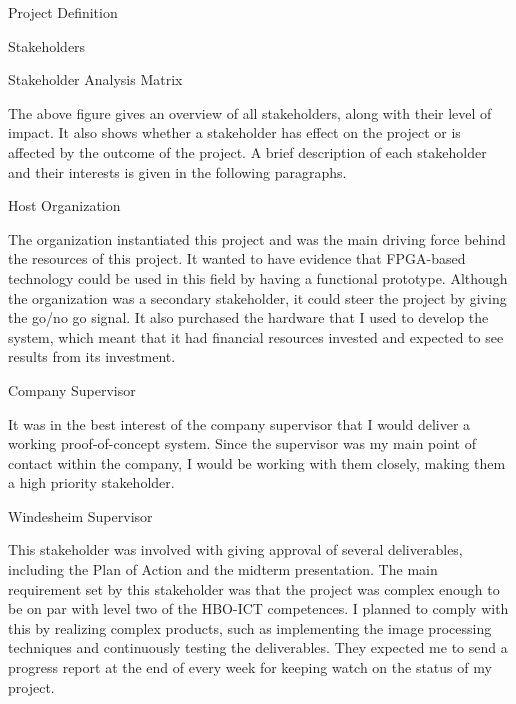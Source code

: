 \documentclass{matthijs}
\begin{document}
\begin{hoofdstuk}{Project Definition}
\begin{paragraaf}{Stakeholders}
\begin{figuur}{Stakeholder Analysis Matrix}
{\begin{tikzpicture}[baseline=(current bounding box.north)]
				\end{tikzpicture}
				}
			\end{figuur}
			\vspace{-1ex}

			\noindent The above figure gives an overview of all stakeholders, along with their level of impact.
			It also shows whether a stakeholder has effect on the project or is affected by the outcome of the project.
			A brief description of each stakeholder and their interests is given in the following paragraphs.

			
			\begin{subparagraaf}{Host Organization}

				The organization instantiated this project and was the main driving force behind the resources of this project.
				It wanted to have evidence that FPGA-based technology could be used in this field by having a functional prototype.
				Although the organization was a secondary stakeholder, it could steer the project by giving the go/no go signal.
				It also purchased the hardware that I used to develop the system, which meant that it had financial resources invested and expected to see results from its investment.

			\end{subparagraaf}

			\begin{subparagraaf}{Company Supervisor}

				It was in the best interest of the company supervisor that I would deliver a working proof-of-concept system.
				Since the supervisor was my main point of contact within the company, I would be working with them closely, making them a high priority stakeholder.


			\end{subparagraaf}

			\begin{subparagraaf}{Windesheim Supervisor}

				This stakeholder was involved with giving approval of several deliverables, including the Plan of Action and the midterm presentation.
				The main requirement set by this stakeholder was that the project was complex enough to be on par with level two of the HBO-ICT competences.
				I planned to comply with this by realizing complex products, such as implementing the image processing techniques and continuously testing the deliverables.
				They expected me to send a progress report at the end of every week for keeping watch on the status of my project.


\end{subparagraaf}
\end{paragraaf}
\end{hoofdstuk}
\end{document}
